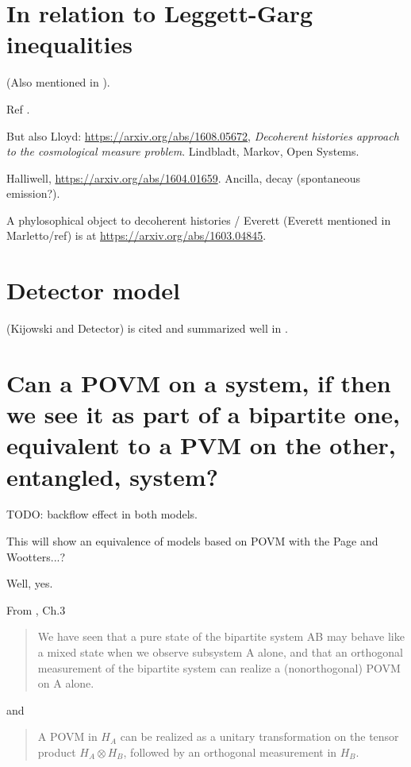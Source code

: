\section{In relation to Leggett-Garg inequalities}
(Also mentioned in \cite{Moreva_position}).

Ref \cite{LeggettGarg+PageWootters}.

But also Lloyd: \url{https://arxiv.org/abs/1608.05672},
\emph{Decoherent histories approach to the cosmological measure problem}.
Lindbladt, Markov, Open Systems.

Halliwell, \url{https://arxiv.org/abs/1604.01659}. Ancilla, decay (spontaneous emission?).

A phylosophical object to decoherent histories / Everett (Everett mentioned in Marletto/ref)
is at
\url{https://arxiv.org/abs/1603.04845}.
\section{Detector model}

\cite{TQM2} (Kijowski and Detector) is cited and summarized well in
\cite{Halliwell_Detector}.



\section{Can a POVM on a system, if then we see it as part of a bipartite one,
equivalent to a PVM on the other, entangled, system?}

TODO: backflow effect in both models.

This will show an equivalence of models based on POVM with the Page and Wootters...?

Well, yes.

From \cite{PreskillNotes}, Ch.3 
\begin{quotation}
We have seen that
a pure state of the bipartite system AB may behave like a mixed state
when we observe subsystem A alone, and that an orthogonal measurement
of the bipartite system can realize a (nonorthogonal) POVM on A alone.
\end{quotation}

and

\begin{quotation}
A POVM in $H_A$ can be realized as a unitary transformation on the tensor
product $H_A \otimes H_B$, followed by an orthogonal measurement in $H_B$.
\end{quotation}

